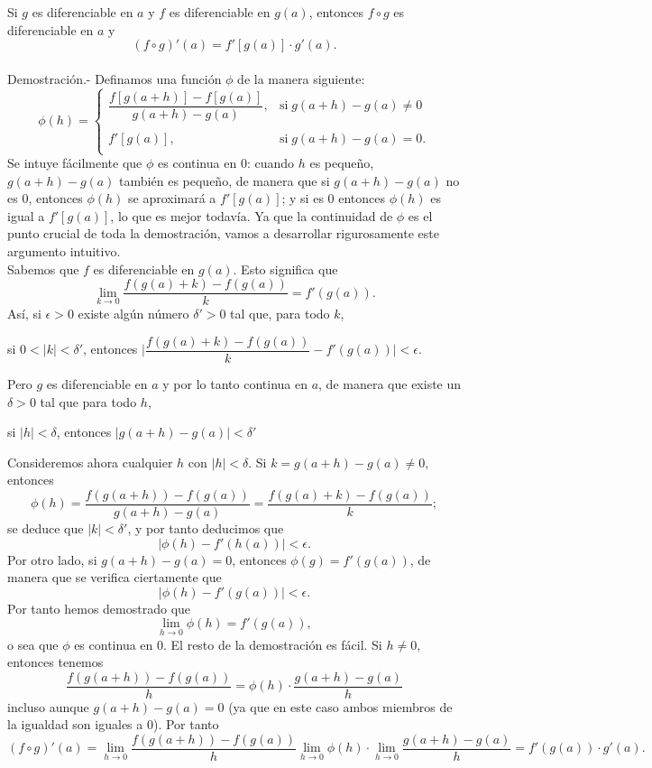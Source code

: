 \begin{teo}
    Si $g$ es diferenciable en $a$ y $f$ es diferenciable en $g(a)$, entonces $f\circ g$ es diferenciable en $a$ y 
    $$\left(f\circ g\right)'(a)=f'\left[g(a)\right]\cdot g'(a).$$\\
	Demostración.-\; Definamos una función $\phi$ de la manera siguiente:
	$$\phi(h)=\left\{\begin{array}{ll}
		\dfrac{f\left[g(a+h)\right]-f\left[g(a)\right]}{g(a+h)-g(a)}, & \mbox{si}\; g(a+h)-g(a)\neq 0\\\\
		f'\left[g(a)\right], & \mbox{si}\; g(a+h)-g(a)=0.\\
	\end{array}\right.$$
	Se intuye fácilmente que $\phi$ es continua en $0$: cuando $h$ es pequeño, $g(a+h)-g(a)$ también es pequeño, de manera que si $g(a+h)-g(a)$ no es $0$, entonces $\phi(h)$ se aproximará a $f'\left[g(a)\right]$; y si es $0$ entonces $\phi(h)$ es igual a $f'\left[g(a)\right]$, lo que es mejor todavía. Ya que la continuidad de $\phi$ es el punto crucial de toda la demostración, vamos a desarrollar rigurosamente este argumento intuitivo.\\
	Sabemos que $f$ es diferenciable en $g(a)$. Esto significa que 
	$$\lim_{k\to 0}\dfrac{f(g(a)+k)-f(g(a))}{k}=f'(g(a)).$$
	Así, si $\epsilon>0$ existe algún número $\delta'>0$ tal que, para todo $k$,
	\begin{center}
	    si $0<|k|<\delta'$, entonces $\bigg|\dfrac{f(g(a)+k)-f(g(a))}{k}-f'(g(a))\bigg|<\epsilon.$
	\end{center}
	Pero $g$ es diferenciable en $a$ y  por lo tanto continua en $a$, de manera que existe un $\delta>0$ tal que para todo $h$,
	\begin{center}
	    si $|h|<\delta$, entonces $|g(a+h)-g(a)|<\delta'$
	\end{center}
	Consideremos ahora cualquier $h$ con $|h|<\delta$. Si $k=g(a+h)-g(a)\neq 0,$ entonces
	$$\phi(h)=\dfrac{f(g(a+h))-f(g(a))}{g(a+h)-g(a)}=\dfrac{f(g(a)+k)-f(g(a))}{k};$$
	se deduce que $|k|<\delta'$, y por tanto deducimos que 
	$$|\phi(h)-f'(h(a))|<\epsilon.$$
	Por otro lado, si $g(a+h)-g(a)=0$, entonces $\phi(g)=f'(g(a))$, de manera que se verifica ciertamente que 
	$$|\phi(h)-f'(g(a))|<\epsilon.$$
	Por tanto hemos demostrado que 
	$$\lim_{h\to 0}\phi(h)=f'(g(a)),$$
	o sea que $\phi$ es continua en $0$. El resto de la demostración es fácil. Si $h\neq 0$, entonces tenemos 
	$$\dfrac{f(g(a+h))-f(g(a))}{h}=\phi(h)\cdot \dfrac{g(a+h)-g(a)}{h}$$
	incluso aunque $g(a+h)-g(a)=0$ (ya que en este caso ambos miembros de la igualdad son iguales a $0$). Por tanto
	$$(f\circ g)'(a)=\lim_{h\to 0}\dfrac{f(g(a+h))-f(g(a))}{h}\lim_{h\to 0}\phi(h)\cdot \lim_{h\to 0}\dfrac{g(a+h)-g(a)}{h}=f'(g(a))\cdot g'(a).$$
\end{teo}

